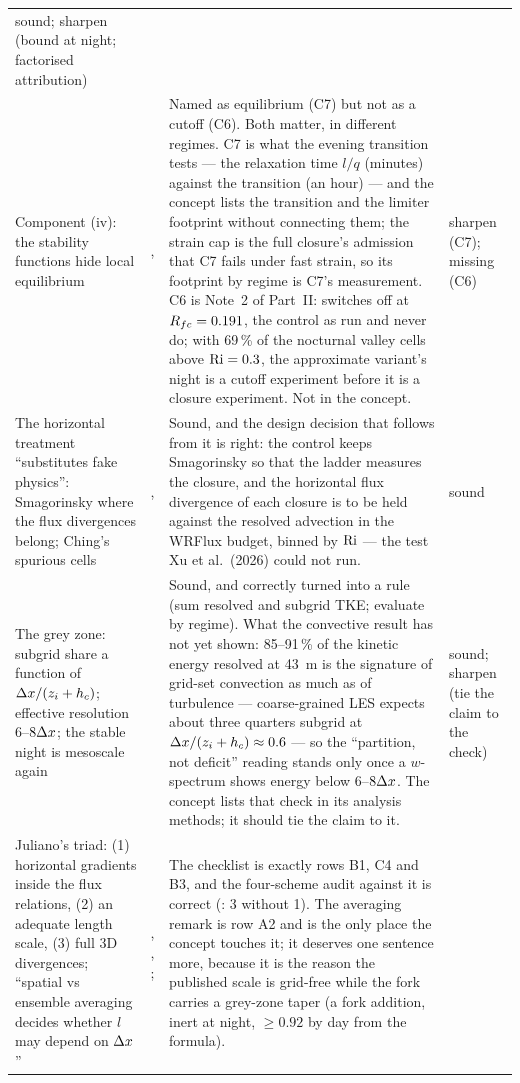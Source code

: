 \begin{center}
\begin{xltabular}{\linewidth}{@{}>{\raggedright\arraybackslash}p{3.3cm}
  >{\raggedright\arraybackslash}p{1.4cm}
  >{\raggedright\arraybackslash}X
  >{\raggedright\arraybackslash}p{1.6cm}@{}}
sound; sharpen (bound at night; factorised attribution) \\
\addlinespace[3pt]
Component (iv): the stability functions hide local equilibrium &
,  &
Named as equilibrium (C7) but not as a cutoff (C6). Both matter, in different regimes. C7 is what the evening transition tests --- the relaxation time $l/q$ (minutes) against the transition (an hour) --- and the concept lists the transition and the limiter footprint without connecting them; the strain cap is the full closure's admission that C7 fails under fast strain, so its footprint by regime is C7's measurement. C6 is Note~2 of Part~II: \schemeA{} switches off at $R_{fc} = 0.191$, the control as run and \schemeF{} never do; with 69\,\% of the nocturnal valley cells above $\mathrm{Ri} = 0.3$, the approximate variant's night is a cutoff experiment before it is a closure experiment. Not in the concept. &
sharpen (C7); missing (C6) \\
\addlinespace[3pt]
The horizontal treatment ``substitutes fake physics'': Smagorinsky where the flux divergences belong; Ching's spurious cells &
,  &
Sound, and the design decision that follows from it is right: the control keeps Smagorinsky so that the ladder measures the closure, and the horizontal flux divergence of each closure is to be held against the resolved advection in the WRFlux budget, binned by $\mathrm{Ri}$ --- the test Xu et al.\ (2026) could not run. &
sound \\
\addlinespace[3pt]
The grey zone: subgrid share a function of $\Delta x/(z_i + h_c)$; effective resolution $6$--$8\Delta x$; the stable night is mesoscale again &
 &
Sound, and correctly turned into a rule (sum resolved and subgrid TKE; evaluate by regime). What the convective result has not yet shown: 85--91\,\% of the kinetic energy resolved at 43~m is the signature of grid-set convection as much as of turbulence --- coarse-grained LES expects about three quarters subgrid at $\Delta x/(z_i + h_c) \approx 0.6$ --- so the ``partition, not deficit'' reading stands only once a $w$-spectrum shows energy below $6$--$8\Delta x$. The concept lists that check in its analysis methods; it should tie the claim to it. &
sound; sharpen (tie the claim to the check) \\
\addlinespace[3pt]
Juliano's triad: (1) horizontal gradients inside the flux relations, (2) an adequate length scale, (3) full 3D divergences; ``spatial vs ensemble averaging decides whether $l$ may depend on $\Delta x$'' &
, , ;  &
The checklist is exactly rows B1, C4 and B3, and the four-scheme audit against it is correct (\schemeA{}: 3 without 1). The averaging remark is row A2 and is the only place the concept touches it; it deserves one sentence more, because it is the reason the published scale is grid-free while the fork carries a grey-zone taper (a fork addition, inert at night, $\ge 0.92$ by day from the formula). &

\end{xltabular}
\end{center}
